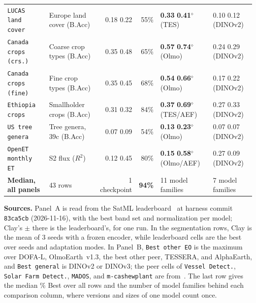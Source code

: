 \begin{table}[!t]
\begin{tabular*}{0.99\textwidth}{@{\extracolsep{\fill}}ll r r l l@{}}
\texttt{LUCAS land cover} & Europe land cover (B.Acc) & 0.18 \slsh{} 0.22 & 55\% & \textbf{0.33} \slsh{} \textbf{0.41}$^\diamond$ (TES) & 0.10 \slsh{} 0.12 (DINOv2) \\
\texttt{Canada crops (crs.)} & Coarse crop types (B.Acc) & 0.35 \slsh{} 0.48 & 65\% & \textbf{0.57} \slsh{} \textbf{0.74}$^\diamond$ (Olmo) & 0.24 \slsh{} 0.29 (DINOv2) \\
\texttt{Canada crops (fine)} & Fine crop types (B.Acc) & 0.35 \slsh{} 0.45 & 68\% & \textbf{0.54} \slsh{} \textbf{0.66}$^\diamond$ (Olmo) & 0.17 \slsh{} 0.22 (DINOv2) \\
\texttt{Ethiopia crops} & Smallholder crops (B.Acc) & 0.31 \slsh{} 0.32 & 84\% & \textbf{0.37} \slsh{} \textbf{0.69}$^\diamond$ (TES/AEF) & 0.27 \slsh{} 0.33 (DINOv2) \\
\texttt{US tree genera} & Tree genera, 39c (B.Acc) & 0.07 \slsh{} 0.09 & 54\% & \textbf{0.13} \slsh{} \textbf{0.23}$^\diamond$ (Olmo) & 0.07 \slsh{} 0.07 (DINOv2) \\
\texttt{OpenET monthly ET} & S2 flux ($R^2$) & 0.12 \slsh{} 0.45 & 80\% & \textbf{0.15} \slsh{} \textbf{0.58}$^\diamond$ (Olmo/AEF) & \text{--}0.27 \slsh{} 0.09 (DINOv2) \\
\midrule
\textbf{Median, all panels} & 43 rows & 1 checkpoint & \textbf{94\%} & 11 model families & 7 model families \\
\bottomrule
\end{tabular*}
\par\smallskip
\begin{minipage}{0.99\textwidth}
\scriptsize\setlength{\parskip}{1.5pt}
\textbf{Sources.} Panel~A is read from the SatML leaderboard~\cite{taylorgeospatial2026satml} at harness commit \texttt{83ca5cb} (2026-11-16), with the best band set and normalization per model; Clay's $\pm$ there is the leaderboard's, for one run. In the segmentation rows, Clay is the mean of 3 seeds with a frozen encoder, while leaderboard cells are the best over seeds and adaptation modes. In Panel~B, \texttt{Best other EO} is the maximum over DOFA-L, OlmoEarth~v1.3, the best other peer, TESSERA, and AlphaEarth, and \texttt{Best general} is DINOv2 or DINOv3; the peer cells of \texttt{Vessel Detect.}, \texttt{Solar Farm Detect.}, \texttt{MADOS}, and \texttt{m-cashewplant} are from~\cite{olmoearth2026v13}. The last row gives the median \% Best over all rows and the number of model families behind each comparison column, where versions and sizes of one model count once.\par

\end{minipage}
\end{table}
